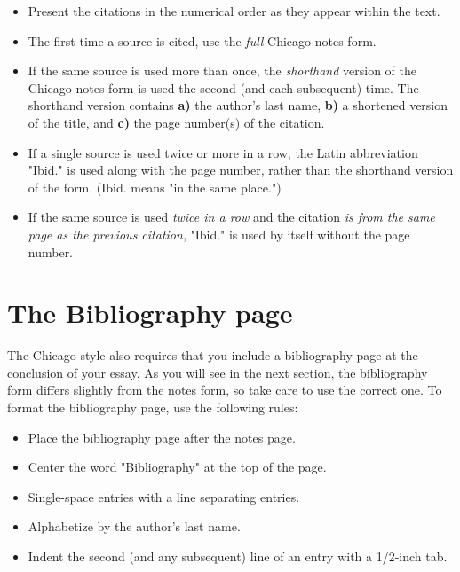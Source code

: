\begin{itemize} \item Present the citations in the numerical order as they
appear within the text.

\item The first time a source is cited, use the \emph{full} Chicago notes form.

\item If the same source is used more than once, the \emph{shorthand} version of
the Chicago  notes form is used the second (and each subsequent) time. The
shorthand version  contains \textbf{a)} the author's last name, \textbf{b)} a
shortened version of the title,  and \textbf{c)} the page number(s) of the
citation.

\item If a single source is used twice or more in a row, the Latin abbreviation
"Ibid." is  used along with the page number, rather than the shorthand version
of the form.  (Ibid. means "in the same place.")

\item If the same source is used \emph{twice in a row} and the citation \emph{is
from  the same page as the previous citation}, "Ibid." is used by itself without
the  page number.  \end{itemize}

\section{The Bibliography page} The Chicago style also requires that you include
a bibliography page at the conclusion of your essay. As you will see in the next
section, the bibliography  form differs slightly from the notes form, so take
care to use the correct one. To format the bibliography page, use the following
rules:

\begin{itemize} \item Place the bibliography page after the notes page. \item
Center the word "Bibliography" at the top of the page. \item Single-space
entries with a line separating entries. \item Alphabetize by the author's last
name. \item Indent the second (and any subsequent) line of an entry with a
1/2-inch tab. \end{itemize}

